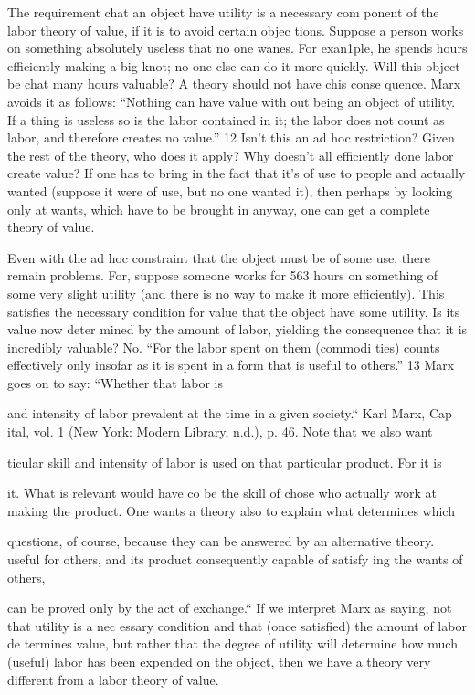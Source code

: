 \documentclass[11pt,openany]{book}
\begin{document}
The requirement chat an object have utility is a necessary com ponent of the labor theory of value, if it is to avoid certain objec tions. Suppose a person works on something absolutely useless that no one wanes. For exan1ple, he spends hours efficiently making a big knot; no one else can do it more quickly. Will this object be chat many hours valuable? A theory should not have chis conse quence. Marx avoids it as follows: ``Nothing can have value with out being an object of utility. If a thing is useless so is the labor contained in it; the labor does not count as labor, and therefore creates no value.'' 12 Isn't this an ad hoc restriction? Given the rest of the theory, who does it apply? Why doesn't all efficiently done labor create value? If one has to bring in the fact that it's of use to people and actually wanted (suppose it were of use, but no one wanted it), then perhaps by looking only at wants, which have to be brought in anyway, one can get a complete theory of value. 

Even with the ad hoc constraint that the object must be of some use, there remain problems. For, suppose someone works for 563 hours on something of some very slight utility (and there is no way to make it more efficiently). This satisfies the necessary condition for value that the object have some utility. Is its value now deter mined by the amount of labor, yielding the consequence that it is incredibly valuable? No. ``For the labor spent on them (commodi ties) counts effectively only insofar as it is spent in a form that is useful to others.'' 13 Marx goes on to say: ``Whether that labor is 

and intensity of labor prevalent at the time in a given society.`` Karl Marx, Cap ital, vol. 1 (New York: Modern Library, n.d.), p. 46. Note that we also want 

ticular skill and intensity of labor is used on that particular product. For it is 

it. What is relevant would have co be the skill of chose who actually work at making the product. One wants a theory also to explain what determines which 

questions, of course, because they can be answered by an alternative theory. useful for others, and its product consequently capable of satisfy ing the wants of others, 

can be proved only by the act of exchange.`` If we interpret Marx as saying, not that utility is a nec essary condition and that (once satisfied) the amount of labor de termines value, but rather that the degree of utility will determine how much (useful) labor has been expended on the object, then we have a theory very different from a labor theory of value. 
\end{document}
